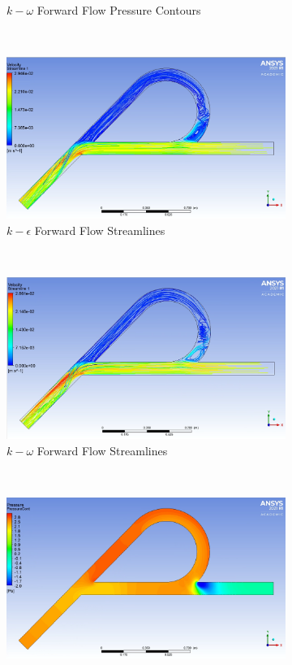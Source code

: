 \begin{figure}[H]
\begin{subfigure}{.45\textwidth}
  \caption{$k-\omega$ Forward Flow Pressure Contours}
  \label{fig:x_d_norm_actual}
\end{subfigure}
~
\begin{subfigure}{.45\textwidth}
  \centering
  \includegraphics[width=.94\linewidth]{images/task3/epsilon_forward_streamline.png}
  \caption{$k-\epsilon$ Forward Flow Streamlines}
  \label{fig:x_d_norm}
\end{subfigure}%
~
\begin{subfigure}{.45\textwidth}
  \centering
  \includegraphics[width=.94\linewidth]{images/task3/omega_forward_streamline.png}
  \caption{$k-\omega$ Forward Flow Streamlines}
  \label{fig:x_d_norm_actual}
\end{subfigure}
~
\begin{subfigure}{.45\textwidth}
  \centering
  \includegraphics[width=.94\linewidth]{images/task3/epsilon_reverse_pressure.png}

\end{subfigure}
\end{figure}
